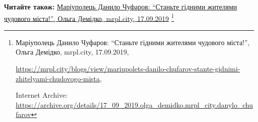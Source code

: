  
 
 
 
 

\def\pubIA{https://archive.org/details/17_09_2019.olga_demidko.mrpl_city.danylo_chufarov}
\def\pubTitle{Маріуполець Данило Чуфаров: \enquote{Станьте гідними жителями чудового міста!}}
\def\pubDate{17.09.2019}
\def\pubOrigin{https://mrpl.city/blogs/view/mariupolets-danilo-chufarov-stante-gidnimi-zhitelyami-chudovogo-mista}
\def\pubAuthor{Ольга Демідко}

\textbf{Читайте також:} \href{\pubIA}{%
\pubTitle, \pubAuthor, mrpl.city, \pubDate}%
\footnote{\pubTitle, \pubAuthor, mrpl.city, \pubDate, \par\url{\pubOrigin}, \par Internet Archive: \url{\pubIA}}
